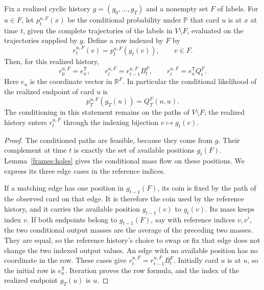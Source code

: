 \begin{lemma}
\label{frames:reference-rows}
Fix a realized cyclic history $g=(g_0,\ldots,g_T)$ and a nonempty set
$F$ of labels. For $u\in F$, let $p_t^{u,F}(x)$ be the conditional
probability under $\mathbb P$ that card $u$ is at $x$ at time $t$, given
the complete trajectories of the labels in $V\setminus F$, evaluated
on the trajectories supplied by $g$. Define a row indexed by $F$ by
\[
 r_t^{u,F}(v)=p_t^{u,F}(g_t(v)),\qquad v\in F.
\]
Then, for this realized history,
\begin{equation}
 r_0^{u,F}=e_u^{\mathsf T},\qquad
 r_t^{u,F}=r_{t-1}^{u,F}B_t^F,
 \qquad r_t^{u,F}=e_u^{\mathsf T}Q_t^F.
 \label{frames:reference-row-flow}
\end{equation}
Here $e_u$ is the coordinate vector in $\mathbb R^F$.
In particular the conditional likelihood of the realized endpoint of
card $u$ is
\begin{equation}
 p_T^{u,F}(g_T(u))=Q_T^F(u,u).
 \label{frames:diagonal-shadow}
\end{equation}
The conditioning in this statement remains on the paths of
$V\setminus F$; the realized history enters $r_t^{u,F}$ through the
indexing bijection $v\mapsto g_t(v)$.
\end{lemma}

\begin{proof}
The conditioned paths are feasible, because they come from $g$.
Their complement at time $t$ is exactly the set of available positions
$g_t(F)$. Lemma~\ref{frames:holes} gives the conditional mass flow on
these positions. We express its three edge cases in the reference
indices.

If a matching edge has one position in $g_{t-1}(F)$, its coin is fixed
by the path of the observed card on that edge. It is therefore the coin
used by the reference history, and it carries the available position
$g_{t-1}(v)$ to $g_t(v)$. Its mass keeps index $v$. If both endpoints
belong to $g_{t-1}(F)$, say with reference indices $v,v'$, the two
conditional output masses are the average of the preceding two masses.
They are equal, so the reference history's choice to swap or fix that
edge does not change the two indexed output values. An edge with no
available position has no coordinate in the row. These cases give
$r_t^{u,F}=r_{t-1}^{u,F}B_t^F$. Initially card $u$ is at $u$, so the
initial row is $e_u^{\mathsf T}$. Iteration proves the row formula, and
the index of the realized endpoint $g_T(u)$ is $u$.
\end{proof}

